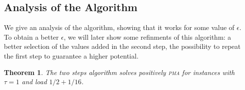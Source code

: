 \documentclass[10pt, conference, letterpaper]{IEEEtran}
\newtheorem{theorem}{Theorem}
\newtheorem{lemma}[theorem]{Lemma}
\newcommand\pma{\textsc{pma}\xspace}
\begin{document}
% 
% 
% 
% 
% 
%  
% 


\subsection{Analysis of the Algorithm}


We give an analysis of the algorithm, showing that it works for some value
of $\epsilon$. To obtain a better $\epsilon$, we will later show some refinments of this algorithm: a better selection of the values added in the second step, the possibility to repeat the first step to guarantee a higher potential.


\begin{theorem}
The two steps algorithm solves positively \pma for instances with $\tau =1$ and load $1/2 + 1/16$.
\end{theorem}
\end{document}

